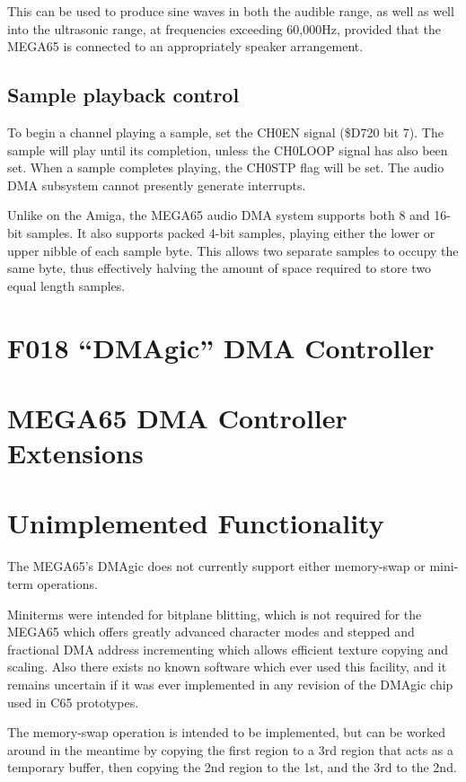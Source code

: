 This can be used to produce sine waves in both the audible range, as
well as well into the ultrasonic range, at frequencies exceeding
60,000Hz, provided that the MEGA65 is connected to an appropriately
speaker arrangement.

\subsection{Sample playback control}

To begin a channel playing a sample, set the CH0EN signal (\$D720 bit
7). The sample will play until its completion, unless the CH0LOOP
signal has also been set. When a sample completes playing, the CH0STP
flag will be set.  The audio DMA subsystem cannot presently generate
interrupts.

Unlike on the Amiga\texttrademark, the MEGA65 audio DMA system supports both
8 and 16-bit samples.  It also supports packed 4-bit samples, playing
either the lower or upper nibble of each sample byte.  This allows two
separate samples to occupy the same byte, thus effectively halving the
amount of space required to store two equal length samples.

\section{F018 ``DMAgic'' DMA Controller}



\section{MEGA65 DMA Controller Extensions}



\section{Unimplemented Functionality}

The MEGA65's DMAgic does not currently support either memory-swap or
mini-term operations.

Miniterms were intended for bitplane blitting,
which is not required for the MEGA65 which offers greatly advanced
character modes and stepped and fractional DMA address incrementing
which allows efficient texture copying and scaling. Also there exists
no known software which ever used this facility, and it remains
uncertain if it was ever implemented in any revision of the DMAgic
chip used in C65 prototypes.

The memory-swap
operation is intended to be implemented, but can be worked around in
the meantime by copying the first region to a 3rd region that acts as
a temporary buffer, then copying the 2nd region to the 1st, and the
3rd to the 2nd.
